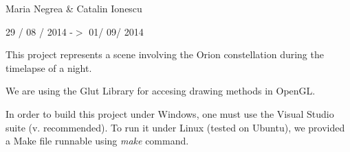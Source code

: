 Maria Negrea \& Catalin Ionescu

29 / 08 / 2014 -\/$>$ 01/ 09/ 2014

This project represents a scene involving the Orion constellation during the timelapse of a night.

We are using the Glut Library for accesing drawing methods in Open\+G\+L.

In order to build this project under Windows, one must use the Visual Studio suite (v. recommended). To run it under Linux (tested on Ubuntu), we provided a Make file runnable using {\itshape make} command. 